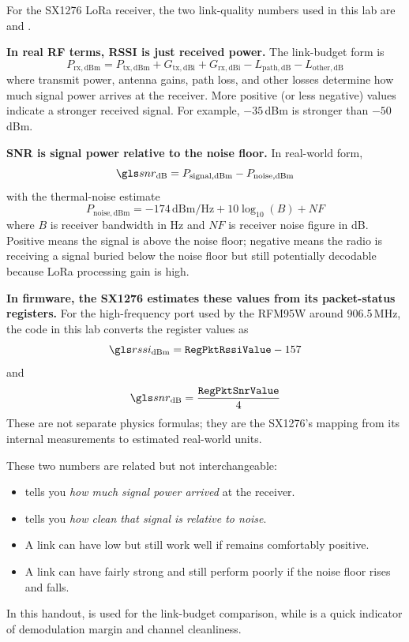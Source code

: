 \documentclass[11pt,letterpaper]{article}
\begin{document}
\begin{tcolorbox}[infobox={How to interpret RSSI and SNR}]
For the SX1276 LoRa receiver, the two link-quality numbers used in this lab are \RSSI{} and \SNR{}.

\textbf{In real RF terms, RSSI is just received power.} The link-budget form is
\[
P_{\mathrm{rx,dBm}} = P_{\mathrm{tx,dBm}} + G_{\mathrm{tx,dBi}} + G_{\mathrm{rx,dBi}} - L_{\mathrm{path,dB}} - L_{\mathrm{other,dB}}
\]
where transmit power, antenna gains, path loss, and other losses determine how much signal power arrives at the receiver. More positive (or less negative) values indicate a stronger received signal. For example, $-35$\,dBm is stronger than $-50$\,dBm.

\textbf{SNR is signal power relative to the noise floor.} In real-world form,
\[
\SNR{}_{\mathrm{dB}} = P_{\mathrm{signal,dBm}} - P_{\mathrm{noise,dBm}}
\]
with the thermal-noise estimate
\[
P_{\mathrm{noise,dBm}} = -174\,\mathrm{dBm/Hz} + 10\log_{10}(B) + NF
\]
where $B$ is receiver bandwidth in Hz and $NF$ is receiver noise figure in dB. Positive \SNR{} means the signal is above the noise floor; negative \SNR{} means the radio is receiving a signal buried below the noise floor but still potentially decodable because LoRa processing gain is high.

\textbf{In firmware, the SX1276 estimates these values from its packet-status registers.} For the high-frequency port used by the RFM95W around 906.5\,MHz, the code in this lab converts the register values as
\[
\RSSI{}_{\mathrm{dBm}} = \texttt{RegPktRssiValue} - 157
\]
and
\[
\SNR{}_{\mathrm{dB}} = \frac{\texttt{RegPktSnrValue}}{4}
\]
These are not separate physics formulas; they are the SX1276's mapping from its internal measurements to estimated real-world units.

These two numbers are related but not interchangeable:
\begin{itemize}[leftmargin=1.5em]
    \item \RSSI{} tells you \emph{how much signal power arrived} at the receiver.
    \item \SNR{} tells you \emph{how clean that signal is relative to noise}.
    \item A link can have low \RSSI{} but still work well if \SNR{} remains comfortably positive.
    \item A link can have fairly strong \RSSI{} and still perform poorly if the noise floor rises and \SNR{} falls.
\end{itemize}
In this handout, \RSSI{} is used for the link-budget comparison, while \SNR{} is a quick indicator of demodulation margin and channel cleanliness.
\end{tcolorbox}
\end{document}
